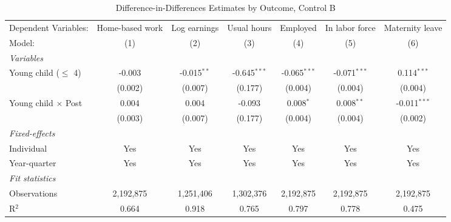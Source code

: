 
\begin{table}[H]
   \caption{\label{tab:did_outcomes_B} Difference-in-Differences Estimates by Outcome, Control B}
   \centering
\footnotesize\setlength{\tabcolsep}{3pt}
   \begin{tabular}{lcccccc}
      \toprule
      Dependent Variables:       & Home-based work & Log earnings  & Usual hours    & Employed       & In labor force & Maternity leave\\  
      Model:                     & (1)             & (2)           & (3)            & (4)            & (5)            & (6)\\  
      \midrule
      \emph{Variables}\\
      Young child ($\leq$ 4)     & -0.003          & -0.015$^{**}$ & -0.645$^{***}$ & -0.065$^{***}$ & -0.071$^{***}$ & 0.114$^{***}$\\   
                                 & (0.002)         & (0.007)       & (0.177)        & (0.004)        & (0.004)        & (0.004)\\   
\addlinespace[2pt]
      Young child $\times$ Post  & 0.004           & 0.004         & -0.093         & 0.008$^{*}$    & 0.008$^{**}$   & -0.011$^{***}$\\   
                                 & (0.003)         & (0.007)       & (0.177)        & (0.004)        & (0.004)        & (0.002)\\   
\addlinespace[2pt]
      \midrule
      \emph{Fixed-effects}\\
      Individual                 & Yes             & Yes           & Yes            & Yes            & Yes            & Yes\\  
      Year-quarter               & Yes             & Yes           & Yes            & Yes            & Yes            & Yes\\  
      \midrule
      \emph{Fit statistics}\\
      Observations               & 2,192,875       & 1,251,406     & 1,302,376      & 2,192,875      & 2,192,875      & 2,192,875\\  
      R$^2$                      & 0.664           & 0.918         & 0.765          & 0.797          & 0.778          & 0.475\\  
\bottomrule
   \end{tabular}
   

\end{table}

